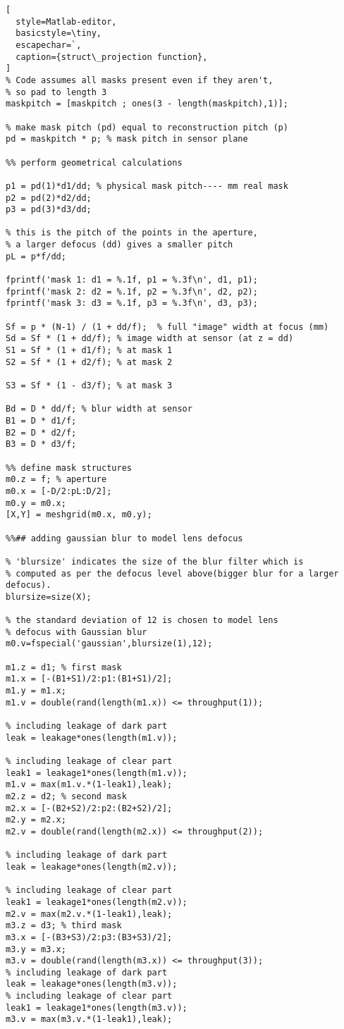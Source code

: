 \begin{lstlisting}[
  style=Matlab-editor,
  basicstyle=\tiny,
  escapechar=`,
  caption={struct\_projection function},
]
% Code assumes all masks present even if they aren't, 
% so pad to length 3
maskpitch = [maskpitch ; ones(3 - length(maskpitch),1)];

% make mask pitch (pd) equal to reconstruction pitch (p)
pd = maskpitch * p; % mask pitch in sensor plane

%% perform geometrical calculations

p1 = pd(1)*d1/dd; % physical mask pitch---- mm real mask
p2 = pd(2)*d2/dd;
p3 = pd(3)*d3/dd;

% this is the pitch of the points in the aperture,
% a larger defocus (dd) gives a smaller pitch
pL = p*f/dd;  

fprintf('mask 1: d1 = %.1f, p1 = %.3f\n', d1, p1);
fprintf('mask 2: d2 = %.1f, p2 = %.3f\n', d2, p2);
fprintf('mask 3: d3 = %.1f, p3 = %.3f\n', d3, p3);

Sf = p * (N-1) / (1 + dd/f);  % full "image" width at focus (mm)
Sd = Sf * (1 + dd/f); % image width at sensor (at z = dd)
S1 = Sf * (1 + d1/f); % at mask 1
S2 = Sf * (1 + d2/f); % at mask 2 

S3 = Sf * (1 - d3/f); % at mask 3

Bd = D * dd/f; % blur width at sensor
B1 = D * d1/f;
B2 = D * d2/f;
B3 = D * d3/f;

%% define mask structures
m0.z = f; % aperture
m0.x = [-D/2:pL:D/2]; 
m0.y = m0.x;
[X,Y] = meshgrid(m0.x, m0.y);

%%## adding gaussian blur to model lens defocus

% 'blursize' indicates the size of the blur filter which is
% computed as per the defocus level above(bigger blur for a larger defocus).
blursize=size(X);

% the standard deviation of 12 is chosen to model lens 
% defocus with Gaussian blur
m0.v=fspecial('gaussian',blursize(1),12); 

m1.z = d1; % first mask
m1.x = [-(B1+S1)/2:p1:(B1+S1)/2];
m1.y = m1.x;
m1.v = double(rand(length(m1.x)) <= throughput(1));

% including leakage of dark part
leak = leakage*ones(length(m1.v)); 

% including leakage of clear part
leak1 = leakage1*ones(length(m1.v)); 
m1.v = max(m1.v.*(1-leak1),leak);
m2.z = d2; % second mask
m2.x = [-(B2+S2)/2:p2:(B2+S2)/2];
m2.y = m2.x;
m2.v = double(rand(length(m2.x)) <= throughput(2));

% including leakage of dark part
leak = leakage*ones(length(m2.v));

% including leakage of clear part
leak1 = leakage1*ones(length(m2.v));
m2.v = max(m2.v.*(1-leak1),leak);
m3.z = d3; % third mask
m3.x = [-(B3+S3)/2:p3:(B3+S3)/2];
m3.y = m3.x;
m3.v = double(rand(length(m3.x)) <= throughput(3));
% including leakage of dark part
leak = leakage*ones(length(m3.v));
% including leakage of clear part
leak1 = leakage1*ones(length(m3.v));
m3.v = max(m3.v.*(1-leak1),leak);


\end{lstlisting}
